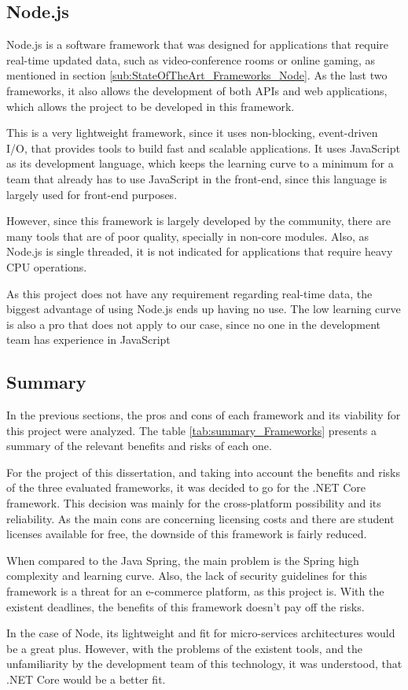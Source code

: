 \subsection{Node.js}
Node.js is a software framework that was designed for applications that require real-time updated data, such as video-conference rooms or online gaming, as mentioned in section \ref{sub:StateOfTheArt_Frameworks_Node}. As the last two frameworks, it also allows the development of both \gls{API}s and web applications, which allows the project to be developed in this framework. 
\par
This is a very lightweight framework, since it uses non-blocking, event-driven I/O, that provides tools to build fast and scalable applications. It uses JavaScript as its development language, which keeps the learning curve to a minimum for a team that already has to use JavaScript in the front-end, since this language is largely used for front-end purposes.
\par
However, since this framework is largely developed by the community, there are many tools that are of poor quality, specially in non-core modules. Also, as Node.js is single threaded, it is not indicated for applications that require heavy \gls{CPU} operations.
\par
As this project does not have any requirement regarding real-time data, the biggest advantage of using Node.js ends up having no use. The low learning curve is also a pro that does not apply to our case, since no one in the development team has experience in JavaScript 


\subsection{Summary}
In the previous sections, the pros and cons of each framework and its viability for this project were analyzed. The table \ref{tab:summary_Frameworks} presents a summary of the relevant benefits and risks of each one.
\par

\par
For the project of this dissertation, and taking into account the benefits and risks of the three evaluated frameworks, it was decided to go for the .NET Core framework. This decision was mainly for the cross-platform possibility and its reliability. As the main cons are concerning licensing costs and there are student licenses available for free, the downside of this framework is fairly reduced.
\par
When compared to the Java Spring, the main problem is the Spring high complexity and learning curve. Also, the lack of security guidelines for this framework is a threat for an e-commerce platform, as this project is. With the existent deadlines, the benefits of this framework doesn't pay off the risks.
\par
In the case of Node, its lightweight and fit for micro-services architectures would be a great plus. However, with the problems of the existent tools, and the unfamiliarity by the development team of this technology, it was understood, that .NET Core would be a better fit.


